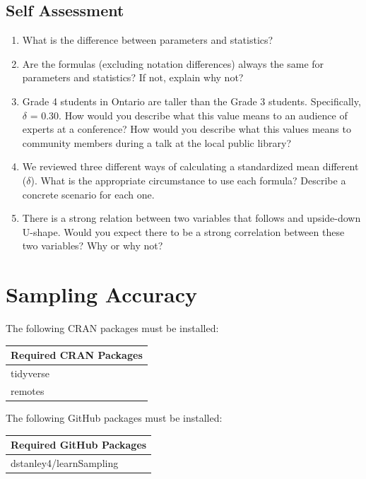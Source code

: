 \documentclass[
]{krantz}
\begin{document}
\hypertarget{self-assessment}{%
\section{Self Assessment}\label{self-assessment}}

\begin{enumerate}
\def\labelenumi{\arabic{enumi}.}
\item
  What is the difference between parameters and statistics?
\item
  Are the formulas (excluding notation differences) always the same for parameters and statistics? If not, explain why not?
\item
  Grade 4 students in Ontario are taller than the Grade 3 students. Specifically, \(\delta\) = 0.30. How would you describe what this value means to an audience of experts at a conference? How would you describe what this values means to community members during a talk at the local public library?
\item
  We reviewed three different ways of calculating a standardized mean different (\(\delta\)). What is the appropriate circumstance to use each formula? Describe a concrete scenario for each one.
\item
  There is a strong relation between two variables that follows and upside-down U-shape. Would you expect there to be a strong correlation between these two variables? Why or why not?
\end{enumerate}

\hypertarget{sampling-accuracy}{%
\chapter{Sampling Accuracy}\label{sampling-accuracy}}

The following CRAN packages must be installed:

\begin{longtable}[]{@{}l@{}}
\toprule
Required CRAN Packages \\
\midrule
\endhead
tidyverse \\
remotes \\
\bottomrule
\end{longtable}

The following GitHub packages must be installed:

\begin{longtable}[]{@{}l@{}}
\toprule
Required GitHub Packages \\
\midrule
\endhead
dstanley4/learnSampling \\
\bottomrule
\end{longtable}
\end{document}
